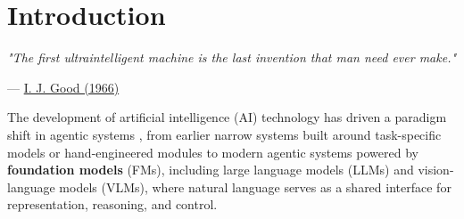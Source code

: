 \section{Introduction}
\label{sec:Introduction}

\begin{tcolorbox}[colback=brown!20!white, colframe=brown!20!white]

{\centering
\textit{"The first ultraintelligent machine is the last invention that man need ever make."}\par
}
\noindent\hfill--- \hyperlink{cite.good1966speculations}{I. J. Good (1966)}\par

\end{tcolorbox}

The development of artificial intelligence (AI) technology has driven a paradigm shift in agentic systems \citep{shoham1993agent, maes1994agents, wooldridge1995intelligent, yao2022react, Wang_2024}, from earlier narrow systems built around task-specific models or hand-engineered modules to modern agentic systems powered by \textbf{foundation models} (FMs), including large language models (LLMs) and vision-language models (VLMs), where natural language serves as a shared interface for representation, reasoning, and control.
